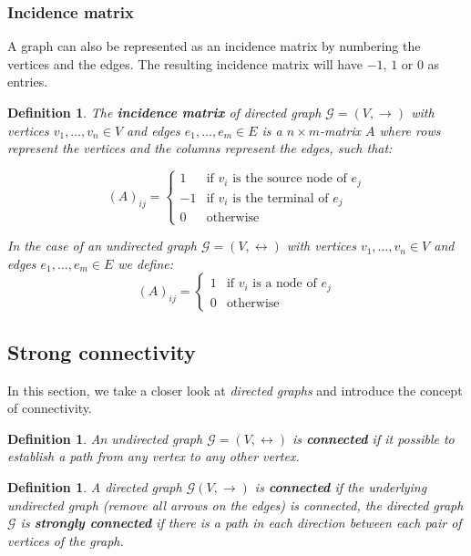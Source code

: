 \documentclass[a4paper,11pt]{report}
\newtheorem{definition}[theorem]{Definition}
\newcommand{\graf}{\mathscr{G}}
\begin{document}
\subsubsection{Incidence matrix}
A graph can also be represented as an incidence matrix by numbering the vertices 
and the edges. The resulting incidence matrix will have $-1$, $1$ or $0$ as entries.

\begin{definition}\label{incidencematrixgraph}
  The \textbf{incidence matrix} of directed graph $\graf = (V, \to)$ with vertices
  $v_1, \ldots, v_n \in V$ and edges $e_1, \ldots, e_m \in E$ is a $n\times m$-matrix $A$ 
  where rows represent the vertices and the columns represent the 
  edges, such that:
  
 $$(A)_{ij} = \begin{cases} 1 &\mbox{if } v_i \text{ is the source node of } e_j    \\ 
  -1 &\mbox{if }v_i \text{ is the terminal of } e_j    \\ 
0 & \mbox{otherwise} \end{cases}$$

In the case of an undirected graph  $\graf = (V, \leftrightarrow)$ with vertices
  $v_1, \ldots, v_n \in V$ and edges $e_1, \ldots, e_m \in E$ we define:
   $$(A)_{ij} = \begin{cases} 1 &\mbox{if }v_i \text{ is a node of } e_j    \\ 
0 & \mbox{otherwise} \end{cases}$$


\end{definition}




\subsection{Strong connectivity}

In this section, we take a closer look at \emph{directed graphs} and introduce 
the concept of connectivity.
\begin{definition}
  An undirected graph $\graf=(V,\leftrightarrow)$ is \textbf{connected} if it possible to establish a path from any 
   vertex to any other vertex.
    \end{definition}
\begin{definition}
  A directed graph $\graf(V, \to)$ is \textbf{connected} if the underlying undirected graph
  (remove all arrows on the edges) is connected, the directed graph $\graf$ is \textbf{strongly connected} if 
  there is a path in each direction between each pair of vertices of the graph.
    \end{definition}
\end{document}
